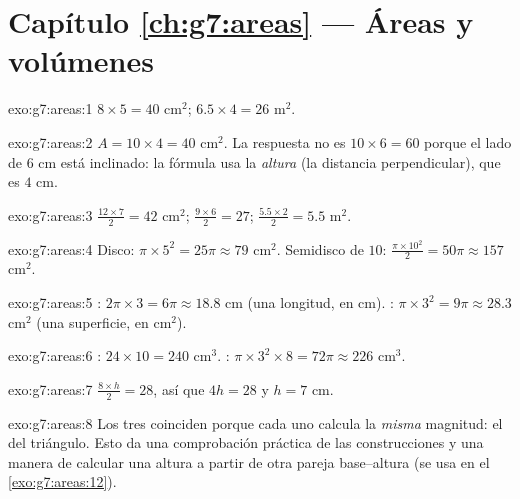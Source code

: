 \section*{Capítulo \ref{ch:g7:areas} --- Áreas y volúmenes}

\begin{solution}{exo:g7:areas:1}
$8 \times 5 = 40$ cm$^2$; \qquad $6.5 \times 4 = 26$ m$^2$.
\end{solution}

\begin{solution}{exo:g7:areas:2}
$A = 10 \times 4 = 40$ cm$^2$. La respuesta no es
$10 \times 6 = 60$ porque el lado de $6$ cm está inclinado: la fórmula
usa la \emph{altura} (la distancia perpendicular), que es $4$ cm.
\end{solution}

\begin{solution}{exo:g7:areas:3}
$\frac{12 \times 7}{2} = 42$ cm$^2$; \quad
$\frac{9 \times 6}{2} = 27$; \quad
$\frac{5.5 \times 2}{2} = 5.5$ m$^2$.
\end{solution}

\begin{solution}{exo:g7:areas:4}
Disco: $\pi \times 5^2 = 25\pi \approx 79$ cm$^2$. Semidisco de 
$10$: $\frac{\pi \times 10^2}{2} = 50\pi \approx 157$ cm$^2$.
\end{solution}

\begin{solution}{exo:g7:areas:5}
: $2\pi \times 3 = 6\pi \approx 18.8$ cm (una longitud, en cm).
: $\pi \times 3^2 = 9\pi \approx 28.3$ cm$^2$ (una superficie, en
cm$^2$).
\end{solution}

\begin{solution}{exo:g7:areas:6}
: $24 \times 10 = 240$ cm$^3$. :
$\pi \times 3^2 \times 8 = 72\pi \approx 226$ cm$^3$.
\end{solution}

\begin{solution}{exo:g7:areas:7}
$\frac{8 \times h}{2} = 28$, así que $4h = 28$ y $h = 7$ cm.
\end{solution}

\begin{solution}{exo:g7:areas:8}
Los tres  coinciden porque cada uno calcula la \emph{misma}
magnitud: el  del triángulo. Esto da una comprobación práctica
de las construcciones y una manera de calcular una altura a partir de otra
pareja base--altura (se usa en el \cref{exo:g7:areas:12}).
\end{solution}

